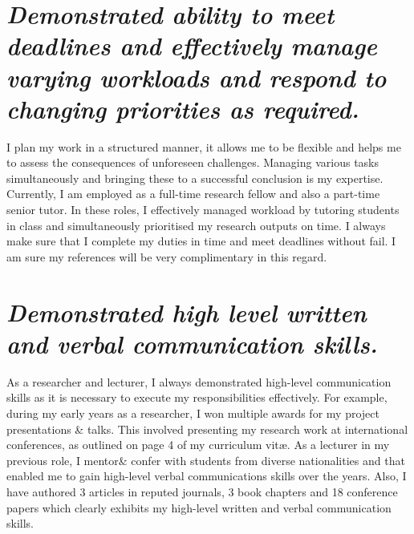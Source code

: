 \documentclass{article}
\begin{document}
\section{\textit{\fontsize{12}{12}\selectfont Demonstrated ability to meet deadlines and effectively manage varying workloads and respond to changing priorities as required.}}



I plan my work in a structured manner, it allows me to be flexible and helps me to assess the consequences of unforeseen challenges. Managing various tasks simultaneously and bringing these to a successful conclusion is my expertise. Currently, I am employed as a full-time research fellow and also a part-time senior tutor. In these roles, I effectively managed workload by tutoring students in class and simultaneously prioritised my research outputs on time. I always make sure that I complete my duties in time and meet deadlines without fail. I am sure my references will be very complimentary in this regard.

\section{\textit{\fontsize{12}{12}\selectfont Demonstrated high level written and verbal communication skills.}}

As a researcher and lecturer, I always demonstrated high-level communication skills as it is necessary to execute my responsibilities effectively. For example, during my early years as a researcher, I won multiple awards for my project presentations \& talks. This involved presenting my research work at international conferences, as outlined on page 4 of my curriculum vitæ. As a lecturer in my previous role, I mentor\& confer with students from diverse nationalities and that enabled me to gain high-level verbal communications skills over the years.  Also, I have authored 3 articles in reputed journals, 3 book chapters and 18 conference papers which clearly exhibits my high-level written and verbal communication skills. 
\end{document}
